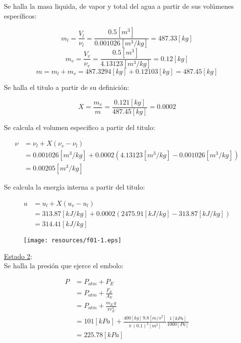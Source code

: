 \documentclass[letter,11pt]{article}
\begin{document}
\begin{enumerate}
Se halla la masa liquida, de vapor y total del agua a partir de sus volúmenes
específicos:

\begin{equation*}
    m_l = \frac{V_l}{\nu_l} = \frac{0.5[m^3]}{0.001026[m^3/kg]} = 487.33[kg]
\end{equation*}
\begin{equation*}
    m_v = \frac{V_v}{\nu_v} = \frac{0.5[m^3]}{4.13123[m^3/kg]} = 0.12[kg]
\end{equation*}
\begin{equation*}
    m = m_l + m_v = 487.3294[kg] + 0.12103[kg] = 487.45[kg]
\end{equation*}

Se halla el titulo a partir de su definición:

\begin{equation*}
    X = \frac{m_v}{m} = \frac{0.121[kg]}{487.45[kg]} = 0.0002
\end{equation*}

Se calcula el volumen especifico a partir del titulo:

\begin{equation*}
    \begin{split}
        \nu &= \nu_l + X(\nu_v - \nu_l) \\
            &= 0.001026[m^3/kg] + 0.0002(4.13123[m^3/kg] - 0.001026[m^3/kg]) \\
            &= 0.00205[m^3/kg]
    \end{split}
\end{equation*}

Se calcula la energía interna a partir del titulo:

\begin{equation*}
    \begin{split}
        u &= u_l + X(u_v - u_l) \\
          &= 313.87[kJ/kg] + 0.0002(2475.91[kJ/kg] - 313.87[kJ/kg]) \\
          &= 314.41[kJ/kg]
    \end{split}
\end{equation*}

\begin{figure}[H]
\centering
\texttt{[image: resources/f01-1.eps]}
\end{figure}

\underline{Estado 2}: \\
Se halla la presión que ejerce el embolo:

\begin{equation*}
    \begin{split}
        P &= P_{atm} + P_E  \\
          &= P_{atm} + \frac{F_E}{A_E} \\
          &= P_{atm} + \frac{m_E\,g}{\pi r_E^2} \\
          &= 101[kPa] + \frac{400[kg]\,9.8[m/s^2]}{\pi\,(0.1)^2[m^2]}
          \frac{1[kPa]}{1000[Pa]} \\
          &= 225.78[kPa]
    \end{split}
\end{equation*}


\end{enumerate}
\end{document}
